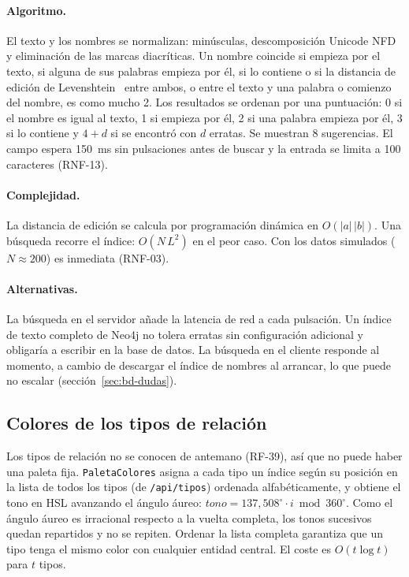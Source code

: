 \paragraph{Algoritmo.} El texto y los nombres se normalizan: minúsculas, descomposición Unicode NFD y eliminación de las marcas diacríticas. Un nombre coincide si empieza por el texto, si alguna de sus palabras empieza por él, si lo contiene o si la distancia de edición de Levenshtein~\cite{levenshtein1966} entre ambos, o entre el texto y una palabra o comienzo del nombre, es como mucho 2. Los resultados se ordenan por una puntuación: 0 si el nombre es igual al texto, 1 si empieza por él, 2 si una palabra empieza por él, 3 si lo contiene y $4+d$ si se encontró con $d$ erratas. Se muestran 8 sugerencias. El campo espera 150~ms sin pulsaciones antes de buscar y la entrada se limita a 100 caracteres (RNF-13).

\paragraph{Complejidad.} La distancia de edición se calcula por programación dinámica en $O(|a|\,|b|)$. Una búsqueda recorre el índice: $O(N\,L^2)$ en el peor caso. Con los datos simulados ($N\approx200$) es inmediata (RNF-03). 

\paragraph{Alternativas.} La búsqueda en el servidor añade la latencia de red a cada pulsación. Un índice de texto completo de Neo4j no tolera erratas sin configuración adicional y obligaría a escribir en la base de datos. La búsqueda en el cliente responde al momento, a cambio de descargar el índice de nombres al arrancar, lo que puede no escalar (sección~\ref{sec:bd-dudas}).

\subsection{Colores de los tipos de relación}
\label{sec:alg-colores}

Los tipos de relación no se conocen de antemano (RF-39), así que no puede haber una paleta fija. \texttt{PaletaColores} asigna a cada tipo un índice según su posición en la lista de todos los tipos (de \texttt{/api/tipos}) ordenada alfabéticamente, y obtiene el tono en HSL avanzando el ángulo áureo: $tono = 137{,}508^\circ\cdot i \bmod 360^\circ$. Como el ángulo áureo es irracional respecto a la vuelta completa, los tonos sucesivos quedan repartidos y no se repiten. Ordenar la lista completa garantiza que un tipo tenga el mismo color con cualquier entidad central. El coste es $O(t\log t)$ para $t$ tipos.

